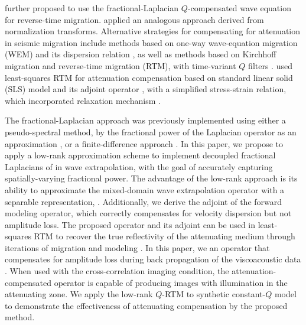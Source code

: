 \cite{zhu14b} further proposed to use the fractional-Laplacian $Q$-compensated wave equation for reverse-time migration. \cite{zhang10} applied an analogous approach derived from normalization transforms. Alternative strategies for compensating for attenuation in seismic migration include methods based on one-way wave-equation migration (WEM) and its dispersion relation \cite[]{valenciano12}, as well as methods based on Kirchhoff migration and reverse-time migration (RTM), with time-variant $Q$ filters \cite[]{cavalca13}. \cite{dutta14} used least-squares RTM for attenuation compensation based on standard linear solid (SLS) model and its adjoint operator \cite[]{blanchsymes}, with a simplified stress-strain relation, which incorporated  relaxation mechanism \cite[]{rob94,blanch95}.

The fractional-Laplacian approach was previously implemented using either a pseudo-spectral method, by  the fractional power of the Laplacian operator as an approximation \cite[]{zhu14a}, or a finite-difference approach \cite[]{lin09}. In this paper, we propose to apply a low-rank approximation scheme \cite[]{lowrank,myself1} to implement decoupled fractional Laplacians of \cite{zhu14a} in wave extrapolation, with the goal of accurately capturing spatially-varying fractional power. The advantage of the low-rank approach is its ability to approximate the mixed-domain wave extrapolation operator with a separable representation, . Additionally, we derive the adjoint of the forward modeling operator, which correctly compensates for velocity dispersion but not amplitude loss. The proposed operator and its adjoint can be used in least-squares RTM to recover the true reflectivity of the attenuating medium through iterations of migration and modeling \cite[]{me14a}. In this paper, we  an operator that compensates for amplitude loss during back propagation of the viscoacoustic data \cite[]{zhu14b}. When used with the cross-correlation imaging condition, the attenuation-compensated operator is capable of producing images with  illumination in the attenuating zone. We apply the low-rank $Q$-RTM to synthetic constant-$Q$ model to demonstrate the effectiveness of attenuating compensation by the proposed method.

